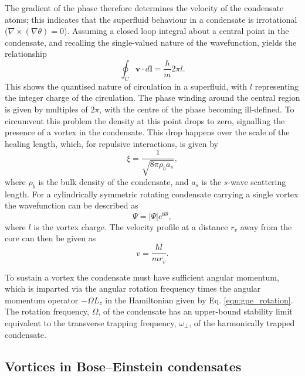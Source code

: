 The gradient of the phase therefore determines the velocity of the condensate atoms; this indicates that the superfluid behaviour in a condensate is irrotational ($\nabla\times(\nabla\theta) =0$). Assuming a closed loop integral about a central point in the condensate, and recalling the single-valued nature of the wavefunction, yields the relationship
\begin{equation}\label{eqn:circulation}
\oint_C \textbf{v}\cdot d\textbf{l} = \frac{\hbar}{m}2\pi l.
\end{equation}
This shows the quantised nature of circulation in a superfluid, with $l$ representing the integer charge of the circulation. The phase winding around the central region is given by multiples of $2\pi$, with the centre of the phase becoming ill-defined. To circumvent this problem the density at this point drops to zero, signalling the presence of a vortex in the condensate. This drop happens over the scale of the healing length, which, for repulsive interactions, is given by
\begin{equation}
\xi = \frac{1}{\sqrt{8\pi \rho_b a_s}},
\end{equation}
where $\rho_b$ is the bulk density of the condensate, and $a_s$ is the $s$-wave scattering length. For a cylindrically symmetric rotating condensate carrying a single vortex the wavefunction can be described as
\begin{equation}\label{eqn:madelung_l}
    \Psi = |\Psi|e^{\textrm{i}l\theta},
\end{equation}
where $l$ is the vortex charge. The velocity profile at a distance $r_{v}$ away from the core can then be given as
\begin{equation}\label{eqn:1_over_r}
    v =\frac{\hbar l}{m r_v}.
\end{equation}

To sustain a vortex the condensate must have sufficient angular momentum, which is imparted via the angular rotation frequency times the angular momentum operator $-\Omega L_z$ in the Hamiltonian given by Eq. \eqref{eqn:gpe_rotation}. The rotation frequency, $\Omega$, of the condensate has an upper-bound stability limit equivalent to the transverse trapping frequency, $\omega_{\perp}$, of the harmonically trapped condensate.

\subsection{Vortices in Bose--Einstein condensates}\label{ss:vorticesinbec}

